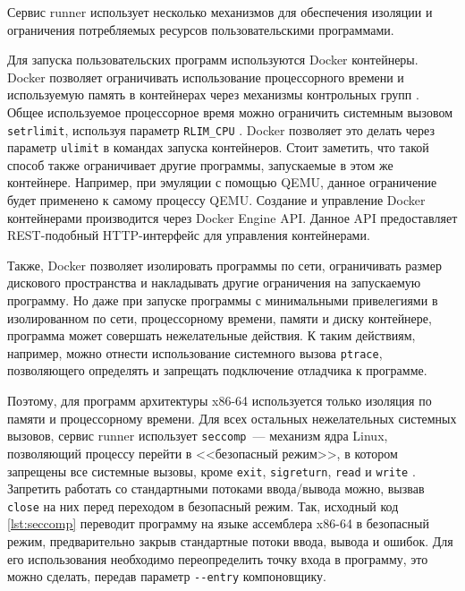 \documentclass[a4paper,article,14pt]{extarticle}
\begin{document}
Сервис runner использует несколько механизмов для обеспечения изоляции и ограничения потребляемых ресурсов пользовательскими программами.

Для запуска пользовательских программ используются Docker контейнеры. Docker позволяет ограничивать использование процессорного времени и используемую память в контейнерах через механизмы контрольных групп \cite{dockerlimits}. Общее используемое процессорное время можно ограничить системным вызовом \texttt{setrlimit}, используя параметр \texttt{RLIM\_CPU} \cite{setrlimit}. Docker позволяет это делать через параметр \texttt{ulimit} в командах запуска контейнеров. Стоит заметить, что такой способ также ограничивает другие программы, запускаемые в этом же контейнере. Например, при эмуляции с помощью QEMU, данное ограничение будет применено к самому процессу QEMU. Создание и управление Docker контейнерами производится через Docker Engine API. Данное API предоставляет REST-подобный HTTP-интерфейс для управления контейнерами.

Также, Docker позволяет изолировать программы по сети, ограничивать размер дискового пространства и накладывать другие ограничения на запускаемую программу. Но даже при запуске программы с минимальными привелегиями в изолированном по сети, процессорному времени, памяти и диску контейнере, программа может совершать нежелательные действия. К таким действиям, например, можно отнести использование системного вызова \texttt{ptrace}, позволяющего определять и запрещать подключение отладчика к программе.

Поэтому, для программ архитектуры x86-64 используется только изоляция по памяти и процессорному времени. Для всех остальных нежелательных системных вызовов, сервис runner использует \texttt{seccomp}~--- механизм ядра Linux, позволяющий процессу перейти в <<безопасный режим>>, в котором запрещены все системные вызовы, кроме \texttt{exit}, \texttt{sigreturn}, \texttt{read} и \texttt{write} \cite{seccomp}. Запретить работать со стандартными потоками ввода/вывода можно, вызвав \texttt{close} на них перед переходом в безопасный режим. Так, исходный код \ref{lst:seccomp} переводит программу на языке ассемблера x86-64 в безопасный режим, предварительно закрыв стандартные потоки ввода, вывода и ошибок. Для его использования необходимо переопределить точку входа в программу, это можно сделать, передав параметр \texttt{-{}-entry} компоновщику.
\end{document}
